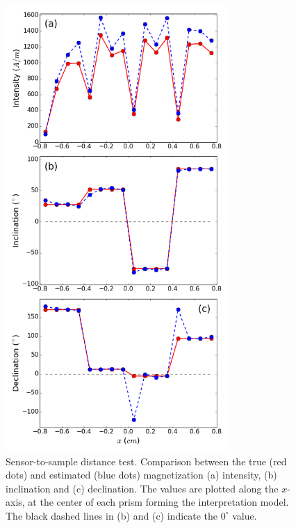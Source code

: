 \documentclass[galley,gc]{agutex}
\begin{document}
 \begin{figure}
 \noindent \includegraphics[width=20pc]{Figs/Fig10_LQ.png}
 \caption{Sensor-to-sample distance test. Comparison between the true (red dots)
 and estimated (blue dots) magnetization (a) intensity, (b) inclination 
 and (c) declination.
 The values are plotted along the $x$-axis, at the center of each 
 prism forming the interpretation model.
 The black dashed lines in (b) and (c) indicate the $0^{\circ}$ value.}
 \label{fig:estimate-sensor2sample}
 \end{figure}
 
\end{document}
